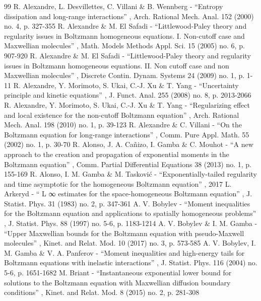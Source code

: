 \documentclass[11pt]{article}
\theoremstyle{plain}
\theoremstyle{definition}
\numberwithin{equation}{section}
\begin{document}
\begin{thebibliography}{99}
 R. Alexandre, L. Desvillettes, C. Villani \& B. Wennberg - “Entropy dissipation and long-range interactions” , Arch. Rational Mech. Anal. 152 (2000) no. 4, p. 327-355
 R. Alexandre \& M. El Safadi - “Littlewood-Paley theory and regularity issues in Boltzmann homogeneous equations. I. Non-cutoff case and Maxwellian molecules” , Math. Models Methods Appl. Sci. 15 (2005) no. 6, p. 907-920
 R. Alexandre \& M. El Safadi - “Littlewood-Paley theory and regularity issues in Boltzmann homogeneous equations. II. Non cutoff case and non Maxwellian molecules” , Discrete Contin. Dynam. Systems 24 (2009) no. 1, p. 1-11
 R. Alexandre, Y. Morimoto, S. Ukai, C.-J. Xu \& T. Yang - “Uncertainty principle and kinetic equations” , J. Funct. Anal. 255 (2008) no. 8, p. 2013-2066
 R. Alexandre, Y. Morimoto, S. Ukai, C.-J. Xu \& T. Yang - “Regularizing effect and local existence for the non-cutoff Boltzmann equation” , Arch. Rational Mech. Anal. 198 (2010) no. 1, p. 39-123
 R. Alexandre \& C. Villani - “On the Boltzmann equation for long-range interactions” , Comm. Pure Appl. Math. 55 (2002) no. 1, p. 30-70
 R. Alonso, J. A. Cañizo, I. Gamba \& C. Mouhot - “A new approach to the creation and propagation of exponential moments in the Boltzmann equation” , Comm. Partial Differential Equations 38 (2013) no. 1, p. 155-169
 R. Alonso, I. M. Gamba \& M. Tasković - “Exponentially-tailed regularity and time asymptotic for the homogeneous Boltzmann equation” , 2017
 L. Arkeryd - “ L ∞ estimates for the space-homogeneous Boltzmann equation” , J. Statist. Phys. 31 (1983) no. 2, p. 347-361
 A. V. Bobylev - “Moment inequalities for the Boltzmann equation and applications to spatially homogeneous problems” , J. Statist. Phys. 88 (1997) no. 5-6, p. 1183-1214
 A. V. Bobylev \& I. M. Gamba - “Upper Maxwellian bounds for the Boltzmann equation with pseudo-Maxwell molecules” , Kinet. and Relat. Mod. 10 (2017) no. 3, p. 573-585
 A. V. Bobylev, I. M. Gamba \& V. A. Panferov - “Moment inequalities and high-energy tails for Boltzmann equations with inelastic interactions” , J. Statist. Phys. 116 (2004) no. 5-6, p. 1651-1682
 M. Briant - “Instantaneous exponential lower bound for solutions to the Boltzmann equation with Maxwellian diffusion boundary conditions” , Kinet. and Relat. Mod. 8 (2015) no. 2, p. 281-308

\end{thebibliography}
\end{document}
